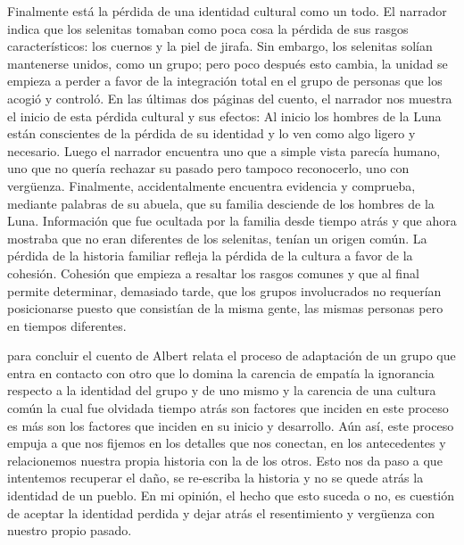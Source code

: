 \documentclass[a3paper]{tufte-handout}
\begin{document}
\begin{flushright}
Finalmente está la pérdida de una identidad cultural como un todo. El narrador indica que los selenitas tomaban como poca cosa la pérdida de sus rasgos característicos: los cuernos y la piel de jirafa. Sin embargo, los selenitas solían mantenerse unidos, como un grupo; pero poco después esto cambia, la unidad se empieza a perder a favor de la integración total en el grupo de personas que los acogió y controló. En las últimas dos páginas del cuento, el narrador nos muestra el inicio de esta pérdida cultural y sus efectos: Al inicio los hombres de la Luna están conscientes de la pérdida de su identidad y lo ven como algo ligero y necesario. Luego el narrador encuentra uno que a simple vista parecía humano, uno que no quería rechazar su pasado pero tampoco reconocerlo, uno con vergüenza. Finalmente, accidentalmente encuentra evidencia y comprueba, mediante palabras de su abuela, que su familia desciende de los hombres de la Luna. Información que fue ocultada por la familia desde tiempo atrás y que ahora mostraba que no eran diferentes de los selenitas, tenían un origen común. La pérdida de la historia familiar refleja la pérdida de la cultura a favor de la cohesión. Cohesión que empieza a resaltar los rasgos comunes y que al final permite determinar, demasiado tarde, que los grupos involucrados no requerían posicionarse puesto que consistían de la misma gente, las mismas personas pero en tiempos diferentes.

\end{flushright}

\noindent
para concluir el cuento de Albert relata el proceso de adaptación de un grupo que entra en contacto con otro que lo domina la carencia de empatía la ignorancia respecto a la identidad del grupo y de uno mismo y la carencia de una cultura común la cual fue olvidada tiempo atrás son factores que inciden en este proceso es más son los factores que inciden en su inicio y desarrollo. Aún así, este proceso empuja a que nos fijemos en los detalles que nos conectan, en los antecedentes y relacionemos nuestra propia historia con la de los otros. Esto nos da paso a que intentemos recuperar el daño, se re-escriba la historia y no se quede atrás la identidad de un pueblo. En mi opinión, el hecho que esto suceda o no, es cuestión de aceptar la identidad perdida y dejar atrás el resentimiento y vergüenza con nuestro propio pasado.

\hrulefill

\end{document}
